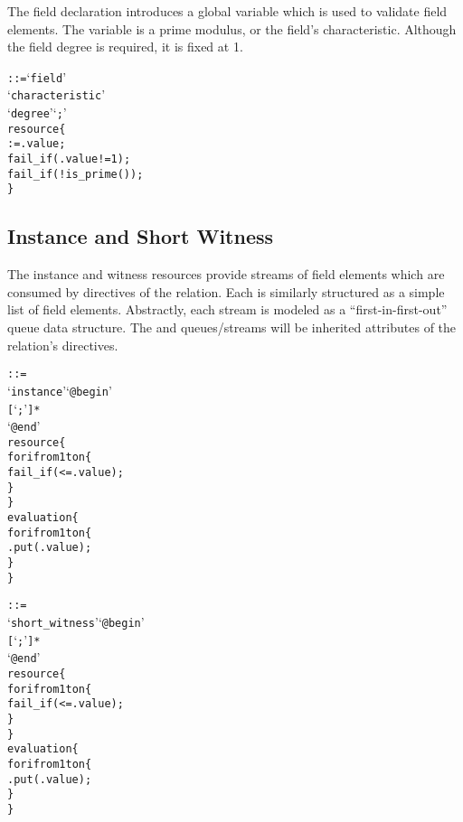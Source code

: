 The field declaration introduces a global variable which is used to validate field elements.
The  variable is a prime modulus, or the field's characteristic.
Although the field degree is required, it is fixed at 1.\\

\begin{alltt}\ttSyn
   ::= `field'
                  `characteristic' 
                  `degree'  `;'\ttSem
  resource \{
     := .value;
    fail_if(.value != 1);
    fail_if(!is_prime());
  \}
\end{alltt}

\subsection{Instance and Short Witness}\label{ins_wit_text}
The instance and witness resources provide streams of field elements which are consumed by directives of the relation.
Each is similarly structured as a simple list of field elements.
Abstractly, each stream is modeled as a ``first-in-first-out'' queue data structure.
The  and  queues/streams will be inherited attributes of the relation's directives. \\

\begin{alltt}\ttSyn
   ::= 
                 `instance' `@begin'
                   [  `;' ]*
                 `@end'\ttSem
  resource \{
    for i from 1 to n \{
      fail_if( <= .value);
    \}
  \}
  evaluation \{
    for i from 1 to n \{
      .put(.value);
    \}
  \}\ttSyn

   ::= 
                      `short_witness' `@begin'
                        [  `;' ]*
                      `@end'\ttSem
  resource \{
    for i from 1 to n \{
      fail_if( <= .value);
    \}
  \}
  evaluation \{
    for i from 1 to n \{
      .put(.value);
    \}
  \}
\end{alltt}

